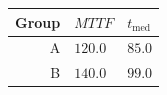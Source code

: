 \begin{tabularx}{\linewidth}{r>{\centering\arraybackslash}X>{\centering\arraybackslash}X}
\toprule  Group & $MTTF$ & $t_\text{med}$\\\midrule
  A & $120.0$ & $85.0$\\\addlinespace
  B & $140.0$ & $99.0$\\\bottomrule
\end{tabularx}